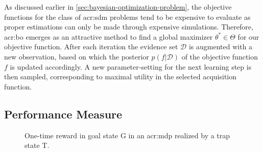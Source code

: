 As discussed earlier in  \autoref{sec:bayesian-optimization-problem}, the objective functions for the class of \acrshort{acr:sdm} problems tend to be expensive to evaluate as proper estimations can only be made through expensive simulations.
Therefore, \acrlong{acr:bo} emerges as an attractive method to find a global maximizer $\theta^\ast \in \Theta$ for our objective function.
After each iteration the evidence set $\mathcal{D}$ is augmented with a new observation, based on which the posterior $p(f\vert \mathcal{D})$ of the objective function $f$ is updated accordingly.
A new parameter-setting for the next learning step is then sampled, corresponding to maximal utility in the selected acquisition function.


\subsection{Performance Measure}
\label{sec:performance-measure}

\begin{figure}[t!]
\centering
{}
\caption{One-time reward in goal state G in an \acrshort{acr:mdp} realized by a trap state T.}
\label{fig:goal-trap-state}
\end{figure}

